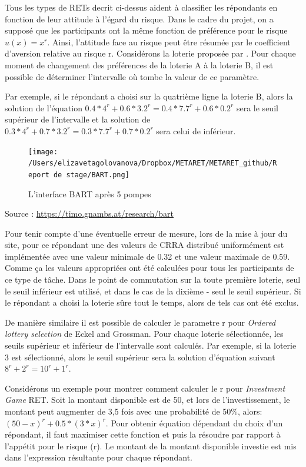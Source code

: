 \documentclass[12pt]{article}
\begin{document}
Tous les types de RETs decrit ci-dessus aident à classifier les
répondants en fonction de leur attitude à l'égard du risque. Dans le
cadre du projet, on a supposé que les participants ont la même fonction
de préférence pour le risque \(u(x) = x^r\). Ainsi, l'attitude face au
risque peut être résumée par le coefficient d'aversion relative au
risque r. Considérons la loterie proposée par \citet{Holt2002}. Pour
chaque moment de changement des préférences de la loterie A à la loterie
B, il est possible de déterminer l'intervalle où tombe la valeur de ce
paramètre.

Par exemple, si le répondant a choisi sur la quatrième ligne la loterie
B, alors la solution de l'équation
\(0.4*4^r + 0.6*3.2^r = 0.4*7.7^r + 0.6*0.2^r\) sera le seuil supérieur
de l'intervalle et la solution de
\(0.3*4^r + 0.7*3.2^r = 0.3*7.7^r + 0.7*0.2^r\) sera celui de inférieur.

\begin{figure}
\centering
\texttt{[image: /Users/elizavetagolovanova/Dropbox/METARET/METARET\_github/Report de stage/BART.png]}
\caption{L'interface BART après 5 pompes}
\end{figure}

Source : \url{https://timo.gnambs.at/research/bart}

Pour tenir compte d'une éventuelle erreur de mesure, lors de la mise à
jour du site, pour ce répondant une des valeurs de CRRA distribué
uniformément est implémentée avec une valeur minimale de 0.32 et une
valeur maximale de 0.59. Comme ça les valeurs appropriées ont été
calculées pour tous les participants de ce type de tâche. Dans le point
de commutation sur la toute première loterie, seul le seuil inférieur
est utilisé, et dans le cas de la dixième - seul le seuil supérieur. Si
le répondant a choisi la loterie sûre tout le temps, alors de tels cas
ont été exclus.

De manière similaire il est possible de calculer le parametre r pour
\emph{Ordered lottery selection} de Eckel and Grossman. Pour chaque
loterie sélectionnée, les seuils supérieur et inférieur de l'intervalle
sont calculés. Par exemple, si la loterie 3 est sélectionné, alors le
seuil supérieur sera la solution d'équation suivant
\(8^r + 2^r = 10^r + 1^r\).

Considérons un exemple pour montrer comment calculer le r pour
\emph{Investment Game} RET. Soit la montant disponible est de 50, et
lors de l'investissement, le montant peut augmenter de 3,5 fois avec une
probabilité de 50\%, alors: \((50 - x)^r + 0.5 * (3 * x)^r\). Pour
obtenir équation dépendant du choix d'un répondant, il faut maximiser
cette fonction et puis la résoudre par rapport à l'appétit pour le
risque (r). Le montant de la montant disponible investie est mis dans
l'expression résultante pour chaque répondant.
\end{document}
